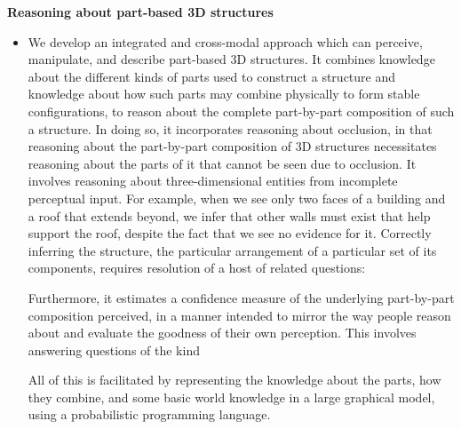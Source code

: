 \documentclass[10pt]{article}
\newenvironment{researchBlock}[1]{%
  \vspace*{0.5ex}
  {\noindent\large \textbf{#1}}
  \begin{itemize}\item}
  {\end{itemize}\vspace{3ex}}
\begin{document}
\begin{researchBlock} {Reasoning about part-based 3D structures}
  We develop an integrated and cross-modal approach which can perceive,
  manipulate, and describe part-based 3D structures.
  It combines knowledge about the different kinds of parts used to construct a
  structure and knowledge about how such parts may combine physically to form
  stable configurations, to reason about the complete part-by-part composition
  of such a structure.
  In doing so, it incorporates reasoning about occlusion, in that reasoning
  about the part-by-part composition of 3D structures necessitates reasoning
  about the parts of it that cannot be seen due to occlusion.
  It involves reasoning about three-dimensional entities from incomplete
  perceptual input. For example, when we see only two faces of a building and a
  roof that extends beyond, we infer that other walls must exist that help
  support the roof, despite the fact that we see no evidence for it. Correctly
  inferring the structure, the particular arrangement of a particular set of
  its components, requires resolution of a host of related questions:
  \vspace{1ex}
  Furthermore, it estimates a confidence measure of the underlying part-by-part
  composition perceived, in a manner intended to mirror the way people reason
  about and evaluate the goodness of their own perception.
  This involves answering questions of the kind
  \vspace{1ex}
  All of this is facilitated by representing the knowledge about the
  parts, how they combine, and some basic world knowledge in a large graphical
  model, using a probabilistic programming language.


\end{researchBlock}
\end{document}
